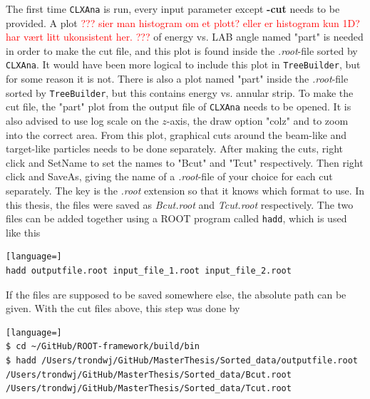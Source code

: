 \documentclass[twoside,english]{uiofysmaster/uiofysmaster}
\begin{document}
The first time \texttt{CLXAna} is run, every input parameter except \textbf{-cut} needs to be provided. 
A plot \textcolor{red}{??? sier man histogram om et plott? eller er histogram kun 1D? har vært litt ukonsistent her. ???} of energy vs. LAB angle named "part" is needed in order to make the cut file, and this plot is found inside the \textit{.root}-file sorted by \texttt{CLXAna}.
It would have been more logical to include this plot in \texttt{TreeBuilder}, but for some reason it is not. 
There is also a plot named "part" inside the \textit{.root}-file sorted by \texttt{TreeBuilder}, but this contains energy vs. annular strip.
To make the cut file, the "part" plot from the output file of \texttt{CLXAna} needs to be opened.
It is also advised to use log scale on the $z$-axis, the draw option "colz" and to zoom into the correct area.
From this plot, graphical cuts around the beam-like and target-like particles needs to be done separately. 
After making the cuts, right click and SetName to set the names to "Bcut" and "Tcut" respectively. 
Then right click and SaveAs, giving the name of a \textit{.root}-file of your choice for each cut separately. 
The key is the \textit{.root} extension so that it knows which format to use. 
In this thesis, the files were saved as \textit{Bcut.root} and \textit{Tcut.root} respectively.
The two files can be added together using a ROOT program called \texttt{hadd}, which is used like this
\begin{lstlisting}[language=]
hadd outputfile.root input_file_1.root input_file_2.root 
\end{lstlisting}
If the files are supposed to be saved somewhere else, the absolute path can be given.
With the cut files above, this step was done by
\begin{lstlisting}[language=]
$ cd ~/GitHub/ROOT-framework/build/bin
$ hadd /Users/trondwj/GitHub/MasterThesis/Sorted_data/outputfile.root /Users/trondwj/GitHub/MasterThesis/Sorted_data/Bcut.root /Users/trondwj/GitHub/MasterThesis/Sorted_data/Tcut.root 
\end{lstlisting}
\end{document}
